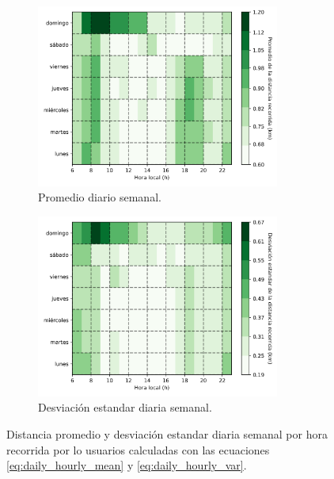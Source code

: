 \begin{figure}[H]
    \centering
    \begin{subfigure}[b]{8cm}
        \includegraphics[width=8cm]{Graphics/daily_hourly_mean_distance.png}
        \caption{Promedio diario semanal.}
        \label{fig:daily_hourly_mean_distance}
    \end{subfigure}
    \begin{subfigure}[b]{8cm}
        \includegraphics[width=8cm]{Graphics/daily_hourly_var_distance.png}
        \caption{Desviación estandar diaria semanal.}
        \label{fig:daily_hourly_var_distance}
    \end{subfigure}
    \caption{Distancia promedio y desviación estandar diaria semanal por hora recorrida por lo usuarios calculadas con las ecuaciones \ref{eq:daily_hourly_mean} y \ref{eq:daily_hourly_var}.}
    \label{fig:daily_hourly_distance}
\end{figure}

